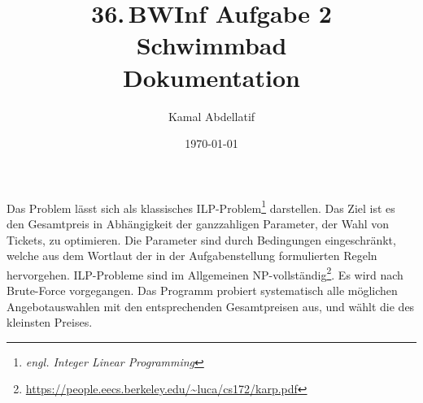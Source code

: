 \documentclass[a4paper, 12pt]{scrartcl}
\title{36.\,BWInf Aufgabe 2\\Schwimmbad\\Dokumentation}
\author{Kamal Abdellatif}
\date{\today}
\begin{document}
\maketitle
Das Problem lässt sich als klassisches ILP-Problem\footnote{\emph{engl. Integer Linear Programming}} darstellen. Das Ziel ist es den Gesamtpreis in Abhängigkeit der ganzzahligen Parameter, der Wahl von Tickets, zu optimieren. Die Parameter sind durch Bedingungen eingeschränkt, welche aus dem Wortlaut der in der Aufgabenstellung formulierten Regeln hervorgehen. ILP-Probleme sind im Allgemeinen NP-vollständig\footnote{\url{https://people.eecs.berkeley.edu/~luca/cs172/karp.pdf}}. Es wird nach Brute-Force vorgegangen. Das Programm probiert systematisch alle möglichen Angebotauswahlen mit den entsprechenden Gesamtpreisen aus, und wählt die des kleinsten Preises.
\end{document}

